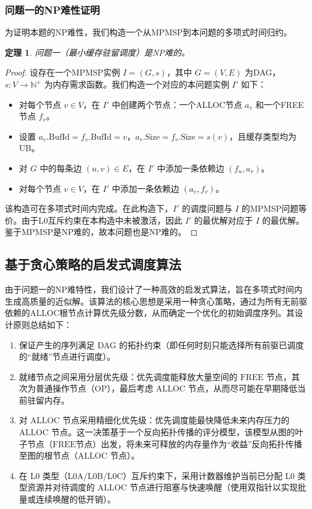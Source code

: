 \documentclass[11pt,a4paper]{article}
\newtheorem{theorem}{定理}
\begin{document}
\subsubsection{问题一的NP难性证明}
\label{subsubsec:reduction}

为证明本题的NP难性，我们构造一个从MPMSP到本问题的多项式时间归约。

\begin{theorem}
问题一（最小缓存驻留调度）是NP难的。
\end{theorem}

\begin{proof}
设存在一个MPMSP实例 $ I = (G, s) $，其中 $ G = (V, E) $ 为DAG，$ s: V \to \mathbb{N}^+ $ 为内存需求函数。我们构造一个对应的本问题实例 $ I' $ 如下：

\begin{itemize}
    \item 对每个节点 $ v \in V $，在 $ I' $ 中创建两个节点：一个ALLOC节点 $ a_v $ 和一个FREE节点 $ f_v $。
    \item 设置 $ a_v.\text{BufId} = f_v.\text{BufId} = v $，$ a_v.\text{Size} = f_v.\text{Size} = s(v) $，且缓存类型均为UB。
    \item 对 $ G $ 中的每条边 $ (u, v) \in E $，在 $ I' $ 中添加一条依赖边 $ (f_u, a_v) $。
    \item 对每个节点 $ v \in V $，在 $ I' $ 中添加一条依赖边 $ (a_v, f_v) $。
\end{itemize}
该构造可在多项式时间内完成。在此构造下，$ I' $ 的调度问题与 $ I $ 的MPMSP问题等价。由于L0互斥约束在本构造中未被激活，因此 $ I' $ 的最优解对应于 $ I $ 的最优解。鉴于MPMSP是NP难的，故本问题也是NP难的。
\end{proof}

\subsection{基于贪心策略的启发式调度算法}
\label{subsec:heuristic_algorithm}
由于问题一的NP难特性，我们设计了一种高效的启发式算法，旨在多项式时间内生成高质量的近似解。该算法的核心思想是采用一种贪心策略，通过为所有无前驱依赖的ALLOC根节点计算优先级分数，从而确定一个优化的初始调度序列。其设计原则总结如下：
\begin{enumerate}[noitemsep]
  \item 保证产生的序列满足 DAG 的拓扑约束（即任何时刻只能选择所有前驱已调度的“就绪”节点进行调度）。
  \item 就绪节点之间采用分层优先级：优先调度能释放大量空间的 \(\mathrm{FREE}\) 节点，其次为普通操作节点（\(\mathrm{OP}\)），最后考虑 \(\mathrm{ALLOC}\) 节点，从而尽可能在早期降低当前驻留内存。
  \item 对 \(\mathrm{ALLOC}\) 节点采用精细化优先级：优先调度能最快降低未来内存压力的\(\mathrm{ALLOC}\) 节点。这一决策基于一个反向拓扑传播的评分模型，该模型从图的叶子节点（\(\mathrm{FREE}\)节点）出发，将未来可释放的内存量作为“收益”反向拓扑传播至图的根节点（\(\mathrm{ALLOC}\) 节点）。
  \item 在 L0 类型（L0A/L0B/L0C）互斥约束下，采用计数器维护当前已分配 L0 类型资源并对待调度的 \(\mathrm{ALLOC}\) 节点进行阻塞与快速唤醒（使用双指针以实现批量或连续唤醒的低开销）。
\end{enumerate}
\end{document}
